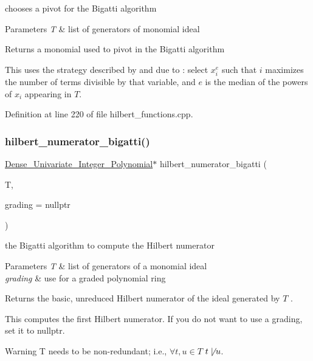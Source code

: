 chooses a pivot for the Bigatti algorithm 


\begin{DoxyParams}{Parameters}
{\em T} & list of generators of monomial ideal \\
\hline
\end{DoxyParams}
\begin{DoxyReturn}{Returns}
a monomial used to pivot in the Bigatti algorithm \cite{Bigatti97}
\end{DoxyReturn}
This uses the strategy described by \cite{RouneHilbert2010} and due to \cite{Bigatti97} \+: select $x_i^e$ such that $i$ maximizes the number of terms divisible by that variable, and $e$ is the median of the powers of $x_i$ appearing in $T$. 

Definition at line 220 of file hilbert\+\_\+functions.\+cpp.

\mbox{\label{group__commalg_ga7ea0076f04ca9380641ff2af7c9a6e42}} 
\subsubsection{\texorpdfstring{hilbert\+\_\+numerator\+\_\+bigatti()}{hilbert\_numerator\_bigatti()}}
{\footnotesize\ttfamily \hyperlink{group__polygroup_class_dense___univariate___integer___polynomial}{Dense\+\_\+\+Univariate\+\_\+\+Integer\+\_\+\+Polynomial}$\ast$ hilbert\+\_\+numerator\+\_\+bigatti (\begin{DoxyParamCaption}\item[{const list$<$ \hyperlink{group__polygroup_class_monomial}{Monomial} $>$ \&}]{T,  }\item[{const W\+T\+\_\+\+T\+Y\+PE $\ast$}]{grading = {\ttfamily nullptr} }\end{DoxyParamCaption})}



the Bigatti algorithm to compute the Hilbert numerator \cite{Bigatti97} 


\begin{DoxyParams}{Parameters}
{\em T} & list of generators of a monomial ideal \\
\hline
{\em grading} & use for a graded polynomial ring \\
\hline
\end{DoxyParams}
\begin{DoxyReturn}{Returns}
the basic, unreduced Hilbert numerator of the ideal generated by $ T $ .
\end{DoxyReturn}
This computes the first Hilbert numerator. If you do not want to use a grading, set it to {\ttfamily nullptr}. \begin{DoxyWarning}{Warning}
{\ttfamily T} needs to be non-\/redundant; i.\+e., $\forall t,u\in T$ $t\not\mid u$.
\end{DoxyWarning}

